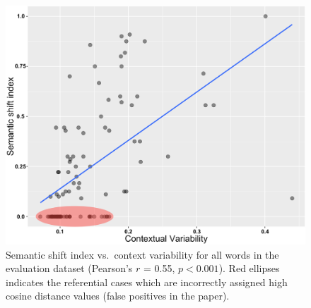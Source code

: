 \begin{figure}[t]\centering
\includegraphics[width=\columnwidth]{images/contextual_variability_shift_index_annotated_2.png}
\caption{Semantic shift index vs.~context variability for all words in the evaluation dataset (Pearson's $r$ = 0.55, $p< 0.001$). Red ellipses indicates the referential cases which are incorrectly assigned high cosine distance values (false positives in the paper).
\label{fig:shift-variability}}
\end{figure}


